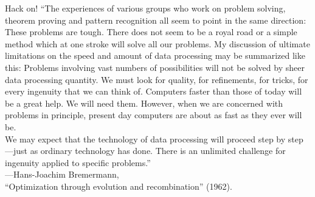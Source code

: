 \documentclass[mathserif,xcolor={dvipsnames,table}]{beamer}
\begin{document}
\begin{frame}{Hack on!}
\small{``The experiences of various groups who work on problem solving, theorem
proving and pattern recognition all seem to point in the same direction: These
problems are tough. There does not seem to be a royal road or a simple method
which at one stroke will solve all our problems. My discussion of ultimate
limitations on the speed and amount of data processing may be summarized like
this: Problems involving vast numbers of possibilities will not be solved by
sheer data processing quantity. We must look for quality, for refinements, for
tricks, for every ingenuity that we can think of. Computers faster than those
of today will be a great help. We will need them. However, when we are
concerned with problems in principle, present day computers are about as fast
as they ever will be.\\
\vspace{.1in}
We may expect that the technology of data processing will proceed step by
step---just as ordinary technology has done. There is an unlimited challenge
for ingenuity applied to specific problems.''}\\
\vspace{.1in}
\scriptsize{\hfill---Hans-Joachim Bremermann,\\ \hfill``Optimization through evolution and recombination'' (1962).}
\end{frame}
\end{document}
